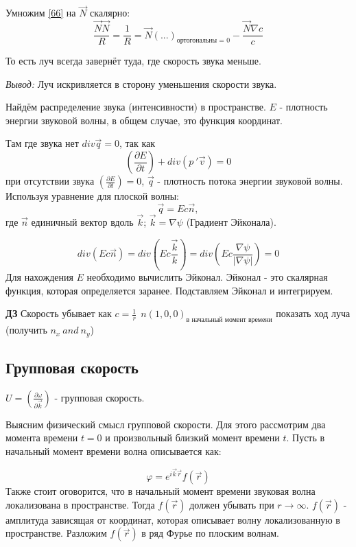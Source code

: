 \documentclass[14pt,a4paper,oneside]{extarticle}	%
\newcommand{\bracket}[1] {\left( #1 \right) } %
\newcommand{\dif}[2] {\bracket{ \frac{\partial #1}{\partial #2} }}
\begin{document}
Умножим \ref{66} на $ \vec{N}  $ скалярно:
\begin{equation*}
\frac{\vec{N} \vec{N} }{R} = \frac{1}{R} = \vec{N}(...)_{\text{ортогональны = 0}} - \frac{\vec{N} \nabla c }{c}
\end{equation*}

То есть луч всегда завернёт туда, где скорость звука меньше. 

\textit{Вывод:} Луч искривляется в сторону уменьшения скорости звука.

Найдём распределение звука (интенсивности) в пространстве.
$ E $ - плотность энергии звуковой волны, в общем случае, это функция координат.

Там где звука нет $ div\vec{q} = 0 $, так как 
\begin{equation*}
\dif{E}{t} + div(p\:'\vec{v}) = 0 
\end{equation*}
при отсутствии звука $ \dif{E}{t} = 0 $, $ \vec{q} $ - плотность потока энергии звуковой волны.
Используя уравнение для плоской волны:
\begin{equation*}
\vec{q} = E c \vec{n},
\end{equation*}
где $ \vec{n} $ единичный вектор вдоль $ \vec{k} $; $ \vec{k} = \nabla \psi  $ (Градиент Эйконала).

\begin{equation*}
div(E c \vec{n} ) = div(E c \frac{\vec{k}}{k} ) = div(E c \frac{\nabla\psi}{|\nabla\psi|})=0
\end{equation*}
Для нахождения $ E $ необходимо вычислить Эйконал.
Эйконал - это скалярная функция, которая определяется заранее.
Подставляем Эйконал и интегрируем.
 

\begin{center}
	\textbf{ДЗ} Скорость убывает как $ c = \frac{1}{r} \:\: n(1,0,0)_{\text{в начальный момент времени}}$ показать ход луча (получить $ n_{x}\: and\: n_{y}  $) 
\end{center}

\begin{center}
	\subsection*{Групповая скорость } %
\end{center}
$ U = \dif{\omega}{\vec{k}} $ - групповая скорость.

Выясним физический смысл групповой скорости.
Для этого рассмотрим два момента времени $ t =0  $ и произвольный близкий момент времени $ t $.
Пусть в начальный момент времени волна описывается как:

\begin{equation*}
\varphi = e^{i\vec{k}\vec{r}}f(\vec{r})
\end{equation*}
Также стоит оговорится, что в начальный момент времени звуковая волна локализована в пространстве. Тогда $ f(\vec{r}) $
должен убывать при $ r \longrightarrow \infty $. $ f(\vec{r}) $ - амплитуда зависящая от координат, которая описывает волну локализованную в пространстве.
Разложим $ f(\vec{r}) $ в ряд Фурье по плоским волнам.


 
\end{document}

